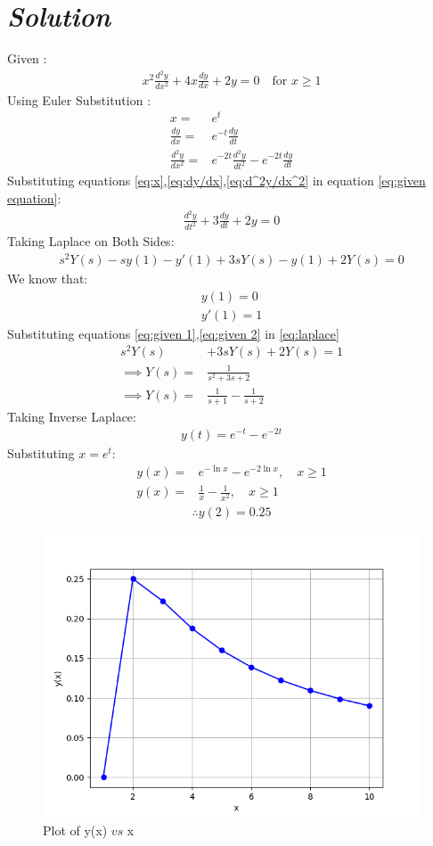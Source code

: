 \documentclass[journal,12pt,twocolumn]{IEEEtran}
\theoremstyle{remark}
\begin{document}
\section*{\textit{\textbf{Solution}}}
\noindent Given : 
\begin{align}
x^2\frac{d^2y}{dx^2} + 4x\frac{dy}{dx} + 2y = 0 \quad \text{for } x\geq 1 \label{eq:given equation}
\end{align}
Using Euler Substitution : 
\begin{align}
x= & e^t \label{eq:x}\\
\frac{dy}{dx}= & e^{-t}\frac{dy}{dt}\label{eq:dy/dx}\\
\frac{d^2y}{dx^2} = & e^{-2t}\frac{d^2y}{dt^2} - e^{-2t}\frac{dy}{dt}\label{eq:d^2y/dx^2}
\end{align}
Substituting equations \eqref{eq:x},\eqref{eq:dy/dx},\eqref{eq:d^2y/dx^2} in equation \eqref{eq:given equation}:
\begin{align}
\frac{d^2y}{dt^2} + 3\frac{dy}{dt} + 2y = 0
\end{align}
Taking Laplace on Both Sides:
\begin{align}
s^2 Y(s) - sy(1)-y'(1) + 3{sY(s) - y(1)} + 2Y(s)= 0\label{eq:laplace}
\end{align}
We know that:
\begin{align}
y(1)=0\label{eq:given 1}\\
y'(1)=1\label{eq:given 2}
\end{align}
Substituting equations \eqref{eq:given 1},\eqref{eq:given 2} in \eqref{eq:laplace}
\begin{align}
s^2Y(s)& + 3sY(s) +2Y(s)= 1\\
\implies Y(s)=&\frac{1}{s^2 + 3s + 2 }\\
\implies Y(s)=&\frac{1}{s+1} - \frac{1}{s+2}
\end{align}
Taking Inverse Laplace:
\begin{align}
y(t) = e^{-t} - e^{-2t}
\end{align}
Substituting $x=e^t$:
\begin{align}
y(x)=& e^{-\ln{x}} - e^{-2\ln{x}},\quad x\geq 1 \\
y(x)=& \frac{1}{x} - \frac{1}{x^2},\quad x\geq 1 
\end{align}
\begin{align}
    \therefore y(2) = 0.25
\end{align}
\begin{figure}[ht]
    \centering
    \includegraphics[width=\columnwidth]{figs/fig.png}
    \caption{Plot of y(x) $vs$ x}
    \label{fig: GATE AE-54(2023)}
\end{figure}
\end{document}
